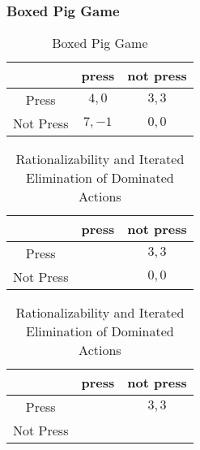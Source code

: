 \documentclass[UTF8,11pt,colorlinks,compress,openany]{beamer}%
\begin{document}
\begin{frame}\frametitle{Boxed Pig Game}
\begin{table}
\begin{tabu}{c|cc}
\hline
 & press & not press\\
\hline
Press & $4,0$ & $3,3$\\
Not Press & $7,-1$ & $0,0$\\
\hline
\end{tabu}\caption{Boxed Pig Game}
\end{table}
\begin{table}
\begin{tabu}{c|cc}
\hline
 & press & not press\\
\hline
Press & & $3,3$\\
Not Press & & $0,0$\\
\hline
\end{tabu}\caption{Rationalizability and Iterated Elimination of Dominated Actions}
\end{table}
\begin{table}
\begin{tabu}{c|cc}
\hline
 & press & not press\\
\hline
Press & & $3,3$\\
Not Press & &\\
\hline
\end{tabu}\caption{Rationalizability and Iterated Elimination of Dominated Actions}
\end{table}
\end{frame}
\end{document}
